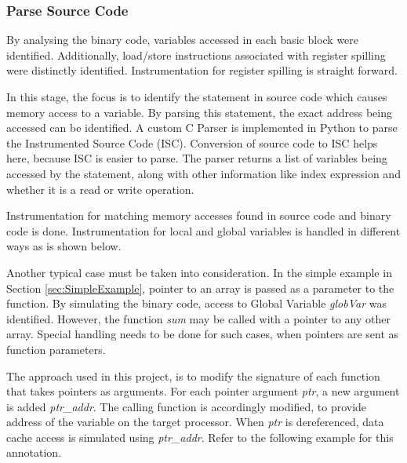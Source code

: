 \subsubsection{Parse Source Code}
By analysing the binary code, variables accessed in each basic block were identified. Additionally, load/store instructions associated with register spilling were distinctly identified. Instrumentation for register spilling is straight forward.

In this stage, the focus is to identify the statement in source code which causes memory access to a variable. By parsing this statement, the exact address being accessed can be identified. A custom C Parser is implemented in Python to parse the Instrumented Source Code (ISC). Conversion of source code to ISC helps here, because ISC is easier to parse. The parser returns a list of variables being accessed by the statement, along with other information like index expression and whether it is a read or write operation.

Instrumentation for matching memory accesses found in source code and binary code is done. Instrumentation for local and global variables is handled in different ways as is shown below.

Another typical case must be taken into consideration. In the simple example in Section \ref{sec:SimpleExample}, pointer to an array is passed as a parameter to the function. By simulating the binary code, access to Global Variable \emph{globVar} was identified. However, the function \emph{sum} may be called with a pointer to any other array. Special handling needs to be done for such cases, when pointers are sent as function parameters.

The approach used in this project, is to modify the signature of each function that takes pointers as arguments. For each pointer argument \emph{ptr}, a new argument is added \emph{ptr\_addr}. The calling function is accordingly modified, to provide address of the variable on the target processor. When \emph{ptr} is dereferenced, data cache access is simulated using \emph{ptr\_addr}. Refer to the following example for this annotation.






